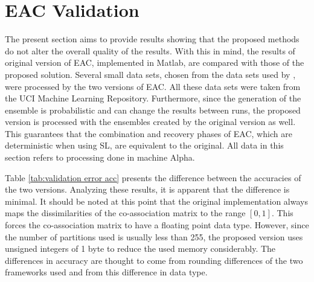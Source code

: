 \section{EAC Validation}
\label{sec:eac validation}

The present section aims to provide results showing that the proposed methods do not alter the overall quality of the results.
With this in mind, the results of original version of EAC, implemented in Matlab, are compared with those of the proposed solution.
Several small data sets, chosen from the data sets used by \citet{Lourenco2010}, were processed by the two versions of EAC.
All these data sets were taken from the UCI Machine Learning Repository. %
Furthermore, since the generation of the ensemble is probabilistic and can change the results between runs, the proposed version is processed with the ensembles created by the original version as well.
This guarantees that the combination and recovery phases of EAC, which are deterministic when using SL, are equivalent to the original.
All data in this section refers to processing done in machine Alpha.

Table \ref{tab:validation error acc} presents the difference between the accuracies of the two versions.
Analyzing these results, it is apparent that the difference is minimal.
It should be noted at this point that the original implementation always maps the dissimilarities of the co-association matrix to the range $\left [ 0 , 1 \right ]$.
This forces the co-association matrix to have a floating point data type.
However, since the number of partitions used is usually less than 255, the proposed version uses unsigned integers of 1 byte to reduce the used memory considerably.
The differences in accuracy are thought to come from rounding differences of the two frameworks used and from this difference in data type.






